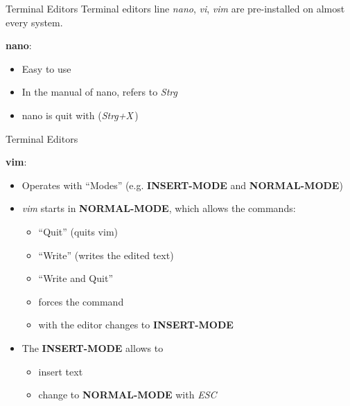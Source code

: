 \documentclass{setbeamer}
\begin{document}
\begin{frame}{Terminal Editors}
    Terminal editors line \emph{nano}, \emph{vi}, \emph{vim} are pre-installed on almost every system.

    \pause
    \vspace{0.3cm}

    \textbf{nano}:
    \begin{itemize}
        \item Easy to use
        \item In the manual of nano,  refers to \emph{Strg}
        \item nano is quit with  (\emph{Strg+X}\,) 
    \end{itemize}
\end{frame}

\begin{frame}{Terminal Editors}

    \textbf{vim}:
    \begin{itemize}
        \item Operates with ``Modes'' (e.g. \textbf{INSERT-MODE} and \textbf{NORMAL-MODE})
        \item \emph{vim} starts in \textbf{NORMAL-MODE}, which allows the commands:
            \begin{itemize}
                \item {}\textemdash ``Quit'' (quits vim)
                \item {}\textemdash ``Write'' (writes the edited text)
                \item {}\textemdash ``Write and Quit''
                \item {} forces the command
                \item with  the editor changes to \textbf{INSERT-MODE}
            \end{itemize}
        \item The \textbf{INSERT-MODE} allows to
            \begin{itemize}
            	\item insert text
                \item change to \textbf{NORMAL-MODE} with \emph{ESC} 
            \end{itemize}
    \end{itemize}
\end{frame}
\end{document}
